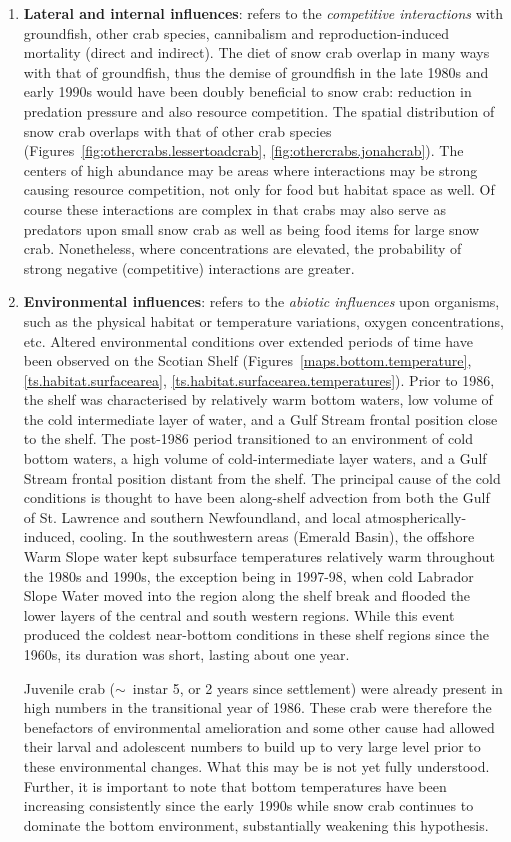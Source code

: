 \documentclass[11pt]{article}
\begin{document}
\begin{enumerate}
\item
  \textbf{Lateral and internal influences}: refers to the \emph{competitive interactions} with groundfish, other crab species, cannibalism and reproduction-induced mortality (direct and indirect). The diet of snow crab overlap in many ways with that of groundfish, thus the demise of groundfish in the late 1980s and early 1990s would have been doubly beneficial to snow crab: reduction in predation pressure and also resource competition. The spatial distribution of snow crab overlaps with that of other crab species (Figures~\ref{fig:othercrabs.lessertoadcrab}, \ref{fig:othercrabs.jonahcrab}). The centers of high abundance may be areas where interactions may be strong causing resource competition, not only for food but habitat space as well. Of course these interactions are complex in that crabs may also serve as predators upon small snow crab as well as being food items for large snow crab. Nonetheless, where concentrations are elevated, the probability of strong negative (competitive) interactions are greater.


\item
  \textbf{Environmental influences}: refers to the \emph{abiotic influences} upon organisms, such as the physical habitat or temperature variations, oxygen concentrations, etc. Altered environmental conditions over extended periods of time have been observed on the Scotian Shelf (Figures~\ref{maps.bottom.temperature}, \ref{ts.habitat.surfacearea}, \ref{ts.habitat.surfacearea.temperatures}). Prior to 1986, the shelf was characterised by relatively warm bottom waters, low volume of the cold intermediate layer of water, and a Gulf Stream frontal position close to the shelf. The post-1986 period transitioned to an environment of cold bottom waters, a high volume of cold-intermediate layer waters, and a Gulf Stream frontal position distant from the shelf. The principal cause of the cold conditions is thought to have been along-shelf advection from both the Gulf of St. Lawrence and southern Newfoundland, and local atmospherically-induced, cooling. In the southwestern areas (Emerald Basin), the offshore Warm Slope water kept subsurface temperatures relatively warm throughout the 1980s and 1990s, the exception being in 1997-98, when cold Labrador Slope Water moved into the region along the shelf break and flooded the lower layers of the central and south western regions. While this event produced the coldest near-bottom conditions in these shelf regions since the 1960s, its duration was short, lasting about one year. 

Juvenile crab ($\sim$~instar 5, or 2 years since settlement) were already present in high numbers in the transitional year of 1986. These crab were therefore the benefactors of environmental amelioration and some other cause had allowed their larval and adolescent numbers to build up to very large level prior to these environmental changes. What this may be is not yet fully understood. Further, it is important to note that bottom temperatures have been increasing consistently since the early 1990s while snow crab continues to dominate the bottom environment, substantially weakening this hypothesis.
\end{enumerate}
\end{document}
